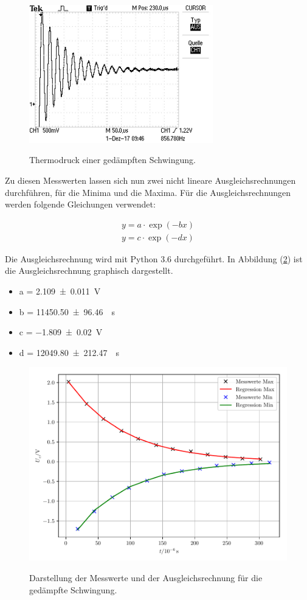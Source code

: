 \begin{figure}[H]
  \centering
  \caption{Thermodruck einer gedämpften Schwingung.}
  \includegraphics[width=10 cm , height= 6cm ]{Kurve.jpg}
  \label{fig:6}
\end{figure}

Zu diesen Messwerten lassen sich nun zwei nicht lineare Ausgleichsrechnungen durchführen,
für die Minima und die Maxima. Für die Ausgleichsrechnungen werden folgende Gleichungen
verwendet:

\begin{gather*}
  y = a \cdot \exp(-bx) \\
  y = c \cdot \exp(-dx)
\end{gather*}

Die Ausgleichsrechnung wird mit Python 3.6 durchgeführt. In Abbildung (\ref{fig:7})
ist die Ausgleichsrechnung graphisch dargestellt.

\begin{itemize}
  \item a = \SI{2.109(11)}{\V}
  \item b = \SI{11450.50(9646)}{\per\second}
  \item c = \SI{-1.809(20)}{\V}
  \item d = \SI{12049.80(21247)}{\per\second}
\end{itemize}

\begin{figure}[H]
  \centering
  \caption{Darstellung der Messwerte und der Ausgleichsrechnung für die gedämpfte Schwingung.}
  \includegraphics[width=\textwidth]{plot1.pdf}
  \label{fig:7}
\end{figure}


